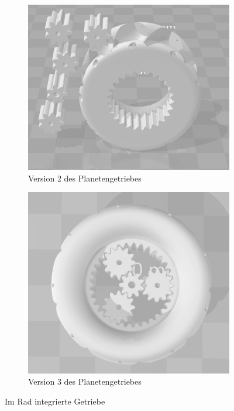 \begin{figure}[!ht]
	\centering
	\begin{subfigure}[b]{0.4\textwidth}
		\includegraphics[width=\textwidth]{bilder/GetriebeVersion3-1.png}
		\caption{Version 2 des Planetengetriebes}
		\label{bild:gearversion3-1}
	\end{subfigure}
	\hspace{0.1\textwidth}%
	\begin{subfigure}[b]{0.4\textwidth}
		\includegraphics[width=\textwidth]{bilder/GetriebeVersion3-2.png}
		\caption{Version 3 des Planetengetriebes}
		\label{bild:gearversion3-2}
	\end{subfigure}
	\caption{Im Rad integrierte Getriebe}
	\label{bild:getrgerade}
\end{figure}

